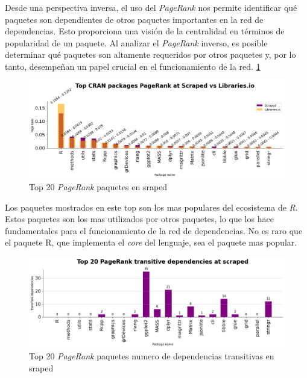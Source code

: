 Desde una perspectiva inversa, el uso del \textit{PageRank} nos permite identificar qué paquetes son
dependientes de otros paquetes importantes en la red de dependencias. Esto proporciona una visión de
la centralidad en términos de popularidad de un paquete. Al analizar el \textit{PageRank} inverso, es
posible determinar qué paquetes son altamente requeridos por otros paquetes y, por lo tanto,
desempeñan un papel crucial en el funcionamiento de la red. \ref{fig:Top 20 PageRank paquetes en sraped}

\begin{figure}[h!]
    \begin{center}
        \includegraphics[width=1\textwidth]{img/cran/pr_inverted.png}
        \caption{Top 20 \textit{PageRank} paquetes en sraped}
        \label{fig:Top 20 PageRank paquetes en sraped}
    \end{center}
\end{figure}

Los paquetes mostrados en este top son los mas populares del ecosistema de \textit{R}.
Estos paquetes son los mas utilizados por otros paquetes, lo que los hace fundamentales para el
funcionamiento de la red de dependencias. No es raro que el paquete R, que implementa el \textit{core}
del lenguaje, sea el paquete mas popular.

\begin{figure}[h!]
    \begin{center}
        \includegraphics[width=1\textwidth]{img/cran/transitive_pr_scr.png}
        \caption{Top 20 \textit{PageRank} paquetes numero de dependencias transitivas en sraped}
        \label{fig:Top 20 PageRank paquetes numero de dependencias transitivas en sraped}
    \end{center}
\end{figure}

